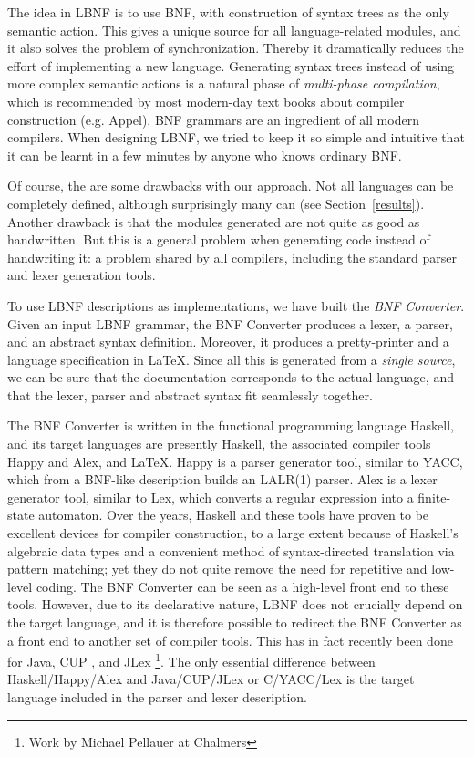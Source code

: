 \documentclass[10pt]{article}
\begin{document}
The idea in LBNF is to use BNF, with construction of syntax trees as
the only semantic action. This gives a unique source for all language-related
modules, and it also solves the problem of synchronization. Thereby it
dramatically reduces the effort of implementing a new language. Generating
syntax trees instead of using more complex semantic actions is
a natural phase of \textit{multi-phase compilation}, which is recommended by most
modern-day text books about compiler construction (e.g. Appel\cite{appel}).
BNF grammars are an ingredient of all modern compilers.
When designing LBNF, we tried to keep it so simple and intuitive that
it can be learnt in a few minutes by anyone who knows ordinary BNF.

Of course, the are some drawbacks with our approach.
Not all languages can be completely
defined, although surprisingly many can (see Section~\ref{results}).
Another drawback is that the modules generated are not quite as good
as handwritten. But this is a general problem when generating code instead
of handwriting it: a problem shared by all compilers, including the
standard parser and lexer generation tools.

To use LBNF descriptions as implementations, we have
built the \textit{BNF Converter}\cite{bnfc}.
Given an input LBNF grammar,
the BNF Converter produces a lexer, a parser, and an abstract
syntax definition. Moreover, it produces a pretty-printer
and a language specification in \LaTeX.
Since all this is generated from a \textit{single source}, we can be sure
that the documentation corresponds to the actual
language, and that the lexer, parser and abstract syntax fit
seamlessly together.

The BNF Converter is written in the functional programming language
Haskell\cite{haskell98}, and
its target languages are presently Haskell, the associated
compiler tools Happy\cite{happy} and Alex\cite{alex}, and \LaTeX.
Happy is a parser generator tool, similar to YACC\cite{johnson-yacc}, which
from a BNF-like description
builds an LALR(1) parser.
Alex is a lexer generator tool, similar to Lex\cite{lesk-lex},
which converts a regular expression
into a finite-state automaton.
Over the years, Haskell and these tools have
proven to be excellent devices for compiler construction,
to a large extent because of Haskell's
algebraic data types and a convenient method of
syntax-directed translation via pattern matching;
yet they do not quite remove the need for repetitive and low-level
coding. The BNF Converter can be seen as a high-level front end
to these tools.
However, due to its declarative nature, LBNF
does not crucially depend on the target language, and
it is therefore possible to redirect the BNF Converter as a front end to
another set of compiler tools. This has in fact recently been done
for Java, CUP \cite{cup}, and
JLex \cite{jlex}\footnote{Work by Michael Pellauer at Chalmers}.
The only essential difference between Haskell/Happy/Alex
and Java/CUP/JLex or C/YACC/Lex
is the target language included in the parser and
lexer description.
\end{document}
